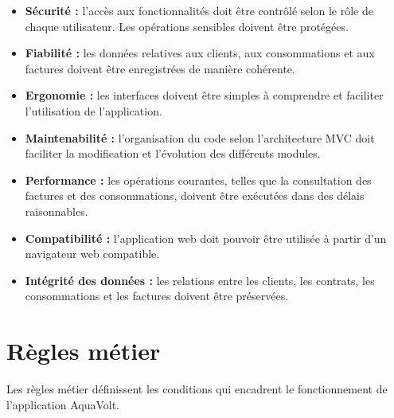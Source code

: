 \begin{itemize}[leftmargin=*]
    \item \textbf{Sécurité :} l'accès aux fonctionnalités doit être contrôlé selon le rôle de chaque utilisateur. Les opérations sensibles doivent être protégées.
    \item \textbf{Fiabilité :} les données relatives aux clients, aux consommations et aux factures doivent être enregistrées de manière cohérente.
    \item \textbf{Ergonomie :} les interfaces doivent être simples à comprendre et faciliter l'utilisation de l'application.
    \item \textbf{Maintenabilité :} l'organisation du code selon l'architecture MVC doit faciliter la modification et l'évolution des différents modules.
    \item \textbf{Performance :} les opérations courantes, telles que la consultation des factures et des consommations, doivent être exécutées dans des délais raisonnables.
    \item \textbf{Compatibilité :} l'application web doit pouvoir être utilisée à partir d'un navigateur web compatible.
    \item \textbf{Intégrité des données :} les relations entre les clients, les contrats, les consommations et les factures doivent être préservées.
\end{itemize}

\section{Règles métier}

Les règles métier définissent les conditions qui encadrent le fonctionnement de l'application AquaVolt.

